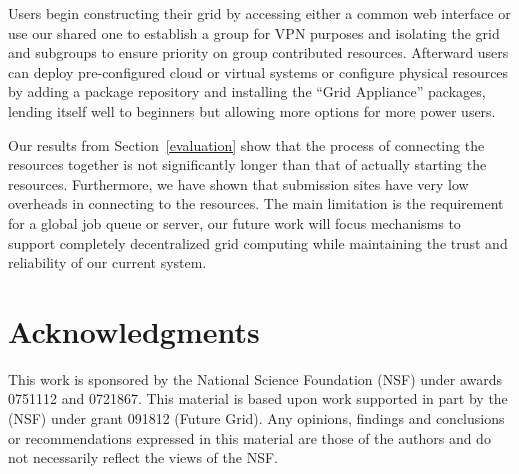 \documentclass[conference]{IEEEtran}
\begin{document}
Users begin constructing their grid by accessing either a common web interface
or use our shared one to establish a group for VPN purposes and isolating the
grid and subgroups to ensure priority on group contributed resources.
Afterward users can deploy pre-configured cloud or virtual systems or configure
physical resources by adding a package repository and installing the ``Grid
Appliance'' packages, lending itself well to beginners but allowing more
options for more power users.

Our results from Section~\ref{evaluation} show that the process of connecting
the resources together is not significantly longer than that of actually
starting the resources.  Furthermore, we have shown that submission sites have
very low overheads in connecting to the resources.  The main limitation is the
requirement for a global job queue or server, our future work will focus
mechanisms to support completely decentralized grid computing while maintaining
the trust and reliability of our current system.

\section*{Acknowledgments}

This work is sponsored by the National Science Foundation (NSF) under awards
0751112 and 0721867.  This material is based upon work supported in part by the
(NSF) under grant 091812 (Future Grid).  Any opinions, findings and conclusions
or recommendations expressed in this material are those of the authors and do
not necessarily reflect the views of the NSF.



\end{document}
